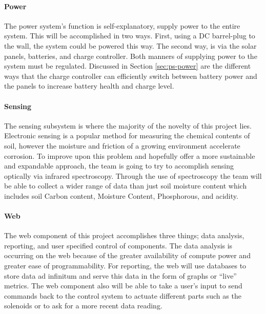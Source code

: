 \paragraph{Power}
The power system's function is self-explanatory, supply power to the entire system. This will be accomplished in two ways. First, using a DC barrel-plug to the wall, the system could be powered this way. The second way, is via the solar panels, batteries, and charge controller. Both manners of supplying power to the system must be regulated. Discussed in Section \ref{sec:ps-power} are the different ways that the charge controller can efficiently switch between battery power and the panels to increase battery health and charge level.
\paragraph{Sensing}
The sensing subsystem is where the majority of the novelty of this project lies. Electronic sensing is a popular method for measuring the chemical contents of soil, however the moisture and friction of a growing environment accelerate corrosion. To improve upon this problem and hopefully offer a more sustainable and expandable approach, the team is going to try to accomplish sensing optically via infrared spectroscopy. Through the use of spectroscopy the team will be able to collect a wider range of data than just soil moisture content which includes soil Carbon content, Moisture Content, Phosphorous, and acidity.
\paragraph{Web}
The web component of this project accomplishes three things; data analysis, reporting, and user specified control of components. The data analysis is occurring on the web because of the greater availability of compute power and greater ease of programmability. For reporting, the web will use databases to store data ad infinitum and serve this data in the form of graphs or ``live'' metrics. The web component also will be able to take a user's input to send commands back to the control system to actuate different parts such as the solenoids or to ask for a more recent data reading.
